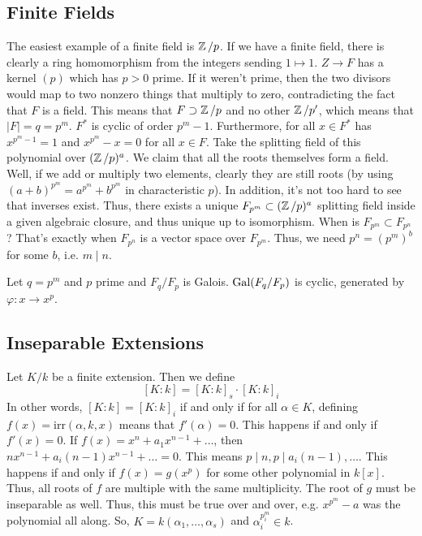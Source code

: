 \subsection{Finite Fields}
The easiest example of a finite field is $\operatorname{\mathbb{Z}}/p$. If we have a finite field,
there is clearly a ring homomorphism from the integers sending $1 \mapsto 1$.
$Z \to F$ has a kernel $(p)$ which has $p > 0$ prime. If it weren't prime, then the two divisors would map to two nonzero
things that multiply to zero, contradicting the fact that $F$ is a field.
This means that $F \supset \operatorname{\mathbb{Z}}/p$ and no other $\operatorname{\mathbb{Z}}/p'$, which means that $|F| = q = p^m$.
$F^*$ is cyclic of order $p^m - 1$. Furthermore, for all $x \in F^*$ has $x^{p^m - 1}= 1$
and $x^{p^m} - x = 0$ for all $x \in F$. Take the splitting field of this polynomial over $(\operatorname{\mathbb{Z}}/p)^a$.
We claim that all the roots themselves form a field. Well, if we add or multiply two elements, clearly they are still roots
(by using $(a + b)^{p^m} = a^{p^m} + b^{p^m}$ in characteristic $p$). In addition, it's not too hard to see that inverses exist.
Thus, there exists a unique $F_{p^m} \subset (\operatorname{\mathbb{Z}}/p)^a$ splitting field inside a given algebraic closure,
and thus unique up to isomorphism. When is $F_{p^m} \subset F_{p^n}$? That's exactly when $F_{p^n}$
is a vector space over $F_{p^m}$. Thus, we need $p^n = (p^m)^b$ for some $b$, i.e. $m \mid n$.

\begin{theorem}
    Let $q = p^m$ and $p$ prime and $F_q / F_p$ is Galois.
    $\operatorname{Gal}(F_q/F_p)$ is cyclic, generated by $\varphi: x \to x^p$.
\end{theorem}

\subsection{Inseparable Extensions}
Let $K/k$ be a finite extension. Then we define
\[ [K:k] = [K:k]_s \cdot [K:k]_i \]
In other words, $[K: k] = [K: k]_i$ if and only if
for all $\alpha \in K$, defining $f(x) = \text{irr}(\alpha, k, x)$
means that $f'(\alpha) = 0$. This happens if and only if $f'(x) = 0$.
If $f(x) = x^n + a_1 x^{n - 1} + \dots$, then $nx^{n - 1} + a_i(n - 1) x^{n - 1} + \dots = 0$.
This means $p \mid n, p\mid a_i(n - 1), \dots$. This happens if and only if $f(x) = g(x^p)$
for some other polynomial in $k[x]$. Thus, all roots of $f$ are multiple with the same multiplicity.
The root of $g$ must be inseparable as well. Thus, this must be true over and over,
e.g. $x^{p^m} - a$ was the polynomial all along. So, $K = k(\alpha_1, \dots, \alpha_s)$
and $\alpha_i^{p^m_i} \in k$.

